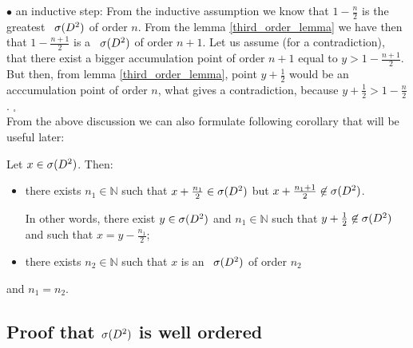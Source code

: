 $\bullet$ an inductive step: From the inductive assumption we know that $1-\frac{n}{2}$ is 
the greatest \apots\ ${{\sigma}(D^2)}$ of order $n$. From the lemma \ref{third_order_lemma} we have then 
that $1-\frac{n+1}{2}$ is a \apots\ ${{\sigma}(D^2)}$ of order $n+1$. Let us assume (for a contradiction), 
that there exist a bigger accumulation point of order $n+1$ equal to $y > 1-\frac{n+1}{2}$. 
But then, from lemma \ref{third_order_lemma}, point $y+\frac{1}{2}$ would be an acccumulation 
point 
of order $n$, what gives a contradiction, because $y+\frac{1}{2}>1-\frac{n}{2}$. $_\square$ 
\\[8pt]
From the above discussion we can also formulate following corollary that will be useful later: 
\begin{corollary}\label{predescors}
Let $x \in {{\sigma}(D^2)}$. Then:
\begin{itemize}
\item there exists $n_1 \in \mathbb{N}$ such that $x + \frac{n_1}{2} \in {{\sigma}(D^2)}$ 
but $x+\frac{n_1+1}{2} \not\in {{\sigma}(D^2)}$. 

In other words, there exist $y \in {{\sigma}(D^2)}$ and 
$n_1 \in \mathbb{N}$ such that 
$y + \frac{1}{2} \not\in {{\sigma}(D^2)}$ and such that $x = y - \frac{n_1}{2}$;
\item there exists $n_2 \in \mathbb{N}$ such that $x$ is an \apots\ ${{\sigma}(D^2)}$ of 
order $n_2$
\end{itemize}
and $n_1 = n_2$.
\end{corollary}

\subsection{Proof that ${{\sigma}(D^2)}$ is well ordered}

